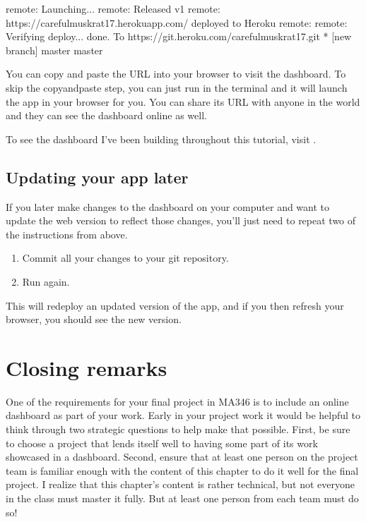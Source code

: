 \documentclass[letterpaper,10pt,english]{sphinxmanual}
\begin{document}
\begin{sphinxVerbatim}[commandchars=\\\{\}]
remote: \PYGZhy{}\PYGZhy{}\PYGZhy{}\PYGZhy{}\PYGZhy{}\PYGZgt{} Launching...
remote:        Released v1
remote:        https://careful\PYGZhy{}muskrat\PYGZhy{}17.herokuapp.com/ deployed to Heroku
remote:
remote: Verifying deploy... done.
To https://git.heroku.com/careful\PYGZhy{}muskrat\PYGZhy{}17.git
 * [new branch]      master \PYGZhy{}\PYGZgt{} master
\end{sphinxVerbatim}

You can copy and paste the  URL into your browser to visit the dashboard.  To skip the copy\sphinxhyphen{}and\sphinxhyphen{}paste step, you can just run  in the terminal and it will launch the app in your browser for you.  You can share its URL with anyone in the world and they can see the dashboard online as well.

To see the dashboard I’ve been building throughout this tutorial, visit .


\subsection{Updating your app later}
\label{\detokenize{chapter-14-dashboards:updating-your-app-later}}
If you later make changes to the dashboard on your computer and want to update the web version to reflect those changes, you’ll just need to repeat two of the instructions from above.
\begin{enumerate}
%
\item {} 
Commit all your changes to your git repository.

\item {} 
Run  again.

\end{enumerate}

This will re\sphinxhyphen{}deploy an updated version of the app, and if you then refresh your browser, you should see the new version.


\section{Closing remarks}
\label{\detokenize{chapter-14-dashboards:closing-remarks}}
One of the requirements for your final project in MA346 is to include an online dashboard as part of your work.  Early in your project work it would be helpful to think through two strategic questions to help make that possible.  First, be sure to choose a project that lends itself well to having some part of its work showcased in a dashboard.  Second, ensure that at least one person on the project team is familiar enough with the content of this chapter to do it well for the final project.  I realize that this chapter’s content is rather technical, but not everyone in the class must master it fully.  But at least one person from each team must do so!
\end{document}
